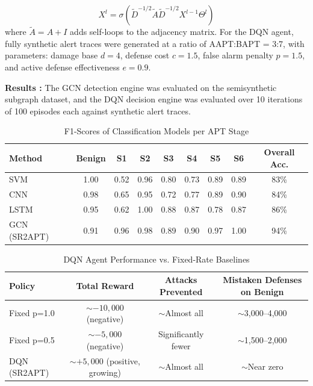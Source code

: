\begin{equation}
X^l = \sigma(\tilde{D}^{-1/2} \tilde{A} \tilde{D}^{-1/2} X^{l-1} \Theta^l)
\end{equation}
where \(\tilde{A} = A + I\) adds self-loops to the adjacency matrix. For the DQN agent, fully synthetic alert traces were generated at a ratio of AAPT:BAPT = 3:7, with parameters: damage base \(d=4\), defense cost \(c=1.5\), false alarm penalty \(p=1.5\), and active defense effectiveness \(e=0.9\).

\textbf{Results \cite{shen2023sr2apt}:} The GCN detection engine was evaluated on the semisynthetic subgraph dataset, and the DQN decision engine was evaluated over 10 iterations of 100 episodes each against synthetic alert traces.

\begin{table}[H]
    \centering
    \caption{F1-Scores of Classification Models per APT Stage \protect\cite{shen2023sr2apt}}
    \begin{tabular}{|l|c|c|c|c|c|c|c|c|}
        \hline
        Method & Benign & S1 & S2 & S3 & S4 & S5 & S6 & Overall Acc. \\
        \hline
        SVM & 1.00 & 0.52 & 0.96 & 0.80 & 0.73 & 0.89 & 0.89 & 83\% \\
        CNN & 0.98 & 0.65 & 0.95 & 0.72 & 0.77 & 0.89 & 0.90 & 84\% \\
        LSTM & 0.95 & 0.62 & 1.00 & 0.88 & 0.87 & 0.78 & 0.87 & 86\% \\
        GCN (SR2APT) & 0.91 & 0.96 & 0.98 & 0.89 & 0.90 & 0.97 & 1.00 & 94\% \\
        \hline
    \end{tabular}
\end{table}

\begin{table}[H]
    \centering
    \caption{DQN Agent Performance vs. Fixed-Rate Baselines \protect\cite{shen2023sr2apt}}
    \begin{tabular}{|l|c|c|c|}
        \hline
        Policy & Total Reward & Attacks Prevented & Mistaken Defenses on Benign \\
        \hline
        Fixed p=1.0 & $\sim-10,000$ (negative) & $\sim$Almost all & $\sim$3,000--4,000 \\
        Fixed p=0.5 & $\sim-5,000$ (negative) & Significantly fewer & $\sim$1,500--2,000 \\
        DQN (SR2APT) & $\sim+5,000$ (positive, growing) & $\sim$Almost all & $\sim$Near zero \\
        \hline
    \end{tabular}
\end{table}

